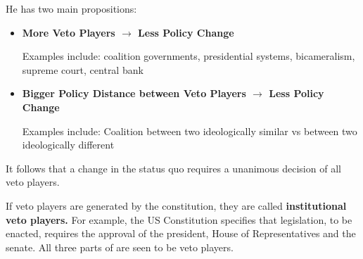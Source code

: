 \documentclass[12pt, letterpaper]{article}
\begin{document}
He has two main propositions:
\begin{itemize}
	\item \textbf{More Veto Players $\rightarrow$ Less Policy Change}
	
	Examples include: coalition governments, presidential systems, bicameralism, supreme court, central bank
	\item \textbf{Bigger Policy Distance between Veto Players $\rightarrow$ Less Policy Change}
	
	Examples include: Coalition between two ideologically similar vs between two ideologically different
\end{itemize}

It follows that a change in the status quo requires a unanimous decision of all veto players. 

If veto players are generated by the constitution, they are called \textbf{institutional veto players.} For example, the US Constitution specifies that legislation, to be enacted, requires the approval of the president, House of Representatives and the senate. All three parts of are seen to be veto players.
\end{document}
